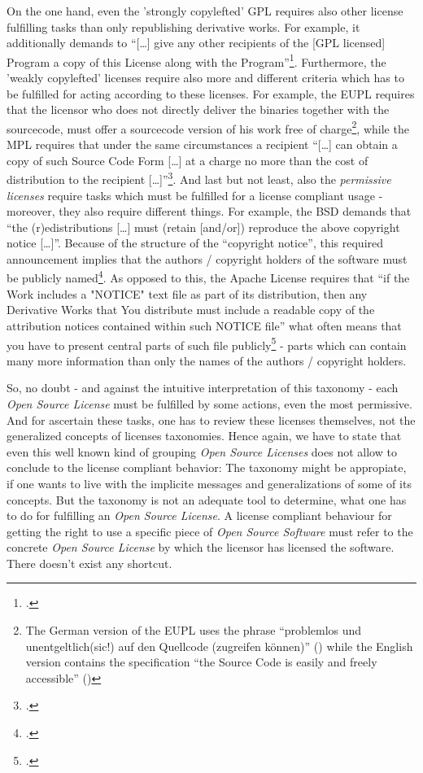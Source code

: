 On the one hand, even the 'strongly copylefted' GPL requires also other license
fulfilling tasks than only republishing derivative works. For example, it
additionally demands to \enquote{[\ldots] give any other recipients of the [GPL
licensed] Program a copy of this License along with the
Program}\footcite[cf.][\nopage wp §1]{Gpl20OsiLicense1991a}. Furthermore, the
'weakly copylefted' licenses require also more and different criteria which has
to be fulfilled for acting according to these licenses. For example, the EUPL
requires that the licensor who does not directly deliver the binaries together
with the sourcecode, must offer a sourcecode version of his work free of
charge\footnote{The German version of the EUPL uses the phrase
\enquote{problemlos und unentgeltlich(sic!) auf den Quellcode (zugreifen
können)} (\cite[cf.][3, section 3]{EuplLicense2007de}) while the English version
contains the specification \enquote{the Source Code is easily and freely
accessible} (\cite[cf.][2, section 3]{EuplLicense2007en})}, while the MPL
requires that under the same circumstances a recipient \enquote{[\ldots] can
obtain a copy of such Source Code Form [\ldots] at a charge no more than the
cost of distribution to the recipient [\ldots]}\footcite[cf.][\nopage section
3.2.a]{Mpl20OsiLicense2013a}. And last but not least, also the \emph{permissive
licenses} require tasks which must be fulfilled for a license compliant usage -
moreover, they also require different things. For example, the BSD demands that
\enquote{the (r)edistributions [\ldots] must (retain [and/or]) reproduce the
above copyright notice [\ldots]}. Because of the structure of the
\enquote{copyright notice}, this required announcement implies that the authors
/ copyright holders of the software must be publicly named\footcite[cf.][\nopage
wp]{BsdLicense2Clause}. As opposed to this, the Apache License requires that
\enquote{if the Work includes a "NOTICE" text file as part of its distribution,
then any Derivative Works that You distribute must include a readable copy of
the attribution notices contained within such NOTICE file} what often means that
you have to present central parts of such file publicly\footcite[cf.][\nopage
wp. section 4.4]{Apl20OsiLicense2004a} - parts which can contain many more
information than only the names of the authors / copyright holders.

So, no doubt - and against the intuitive interpretation of this taxonomy - each
\emph{Open Source License} must be fulfilled by some actions, even the most
permissive. And for ascertain these tasks, one has to review these licenses
themselves, not the generalized concepts of licenses taxonomies. Hence again, we
have to state that even this well known kind of grouping \emph{Open Source
Licenses} does not allow to conclude to the license compliant behavior: The
taxonomy might be appropiate, if one wants to live with the implicite messages
and generalizations of some of its concepts. But the taxonomy is not an adequate
tool to determine, what one has to do for fulfilling an \emph{Open Source
License}. A license compliant behaviour for getting the right to use a specific
piece of \emph{Open Source Software} must refer to the concrete \emph{Open
Source License} by which the licensor has licensed the software. There doesn't
exist any shortcut.

